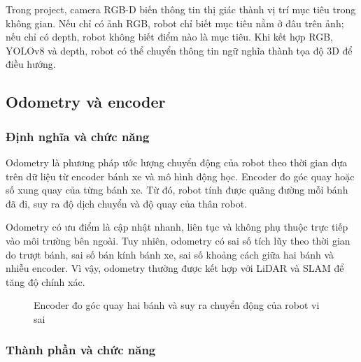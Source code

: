 Trong project, camera RGB-D biến thông tin thị giác thành vị trí mục
tiêu trong không gian. Nếu chỉ có ảnh RGB, robot chỉ biết mục tiêu nằm ở
đâu trên ảnh; nếu chỉ có depth, robot không biết điểm nào là mục tiêu.
Khi kết hợp RGB, YOLOv8 và depth, robot có thể chuyển thông tin ngữ
nghĩa thành tọa độ 3D để điều hướng.

\subsection{Odometry và encoder}\label{subsec:odometry}

\subsubsection{Định nghĩa và chức năng}

Odometry là phương pháp ước lượng chuyển động của robot theo thời gian
dựa trên dữ liệu từ encoder bánh xe và mô hình động học. Encoder đo góc
quay hoặc số xung quay của từng bánh xe. Từ đó, robot tính được quãng
đường mỗi bánh đã đi, suy ra độ dịch chuyển và độ quay của thân robot.

Odometry có ưu điểm là cập nhật nhanh, liên tục và không phụ thuộc trực
tiếp vào môi trường bên ngoài. Tuy nhiên, odometry có sai số tích lũy
theo thời gian do trượt bánh, sai số bán kính bánh xe, sai số khoảng
cách giữa hai bánh và nhiễu encoder. Vì vậy, odometry thường được kết
hợp với LiDAR và SLAM để tăng độ chính xác.

\begin{figure}[H]
\centering
{}
\caption{Encoder đo góc quay hai bánh và suy ra chuyển động của robot vi sai}
\label{fig:encoder-odometry}
\end{figure}

\subsubsection{Thành phần và chức năng}

